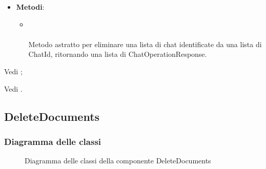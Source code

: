 \documentclass[10pt, a4paper]{article}
\begin{document}
\label{DeleteChatsUseCaseDettaglio}
\begin{itemize}
    \item \textbf{Metodi}:
    \begin{itemize}
        \item {}\\ \\
        Metodo astratto per eliminare una lista di chat identificate da una lista di ChatId, ritornando una lista di ChatOperationResponse.
    \end{itemize}
\end{itemize}



Vedi ;




Vedi .





\subsection{DeleteDocuments}
\subsubsection{Diagramma delle classi}

\begin{figure}[H]
    \centering        
    \caption{Diagramma delle classi della componente DeleteDocuments}
\end{figure}
\end{document}
